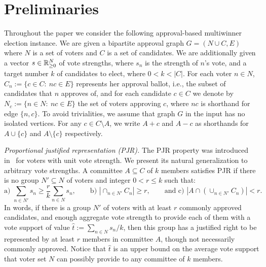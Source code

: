 \section{Preliminaries}\label{s:prel}

Throughout the paper we consider the following approval-based multiwinner election instance. 
We are given a bipartite approval graph $G=(N\cup C, E)$ where $N$ is a set of voters and $C$ is a set of candidates. 
We are additionally given a vector $s\in\mathbb{R}_{\geq 0}^N$ of vote strengths, where $s_n$ is the strength of $n$'s vote, and a target number $k$ of candidates to elect, where $0< k<|C|$.
For each voter $n\in N$, $C_n:=\{c\in C: \ nc\in E\}$ represents her approval ballot, i.e., the subset of candidates that $n$ approves of, and for each candidate $c\in C$ we denote by $N_c:=\{n\in N: \ nc\in E\}$ the set of voters approving $c$, where $nc$ is shorthand for edge $\{n,c\}$. 
To avoid trivialities, we assume that graph $G$ in the input has no isolated vertices. 
For any $c\in C\setminus A$, we write $A+c$ and $A-c$ as shorthands for $A\cup\{c\}$ and $A\setminus \{c\}$ respectively. 

\emph{Proportional justified representation (PJR).} 
The PJR property was introduced in~\cite{sanchez2017proportional} for voters with unit vote strength. We present its natural generalization to arbitrary vote strengths. A committee $A\subseteq C$ of $k$ members satisfies PJR if there is no group $N'\subseteq N$ of voters and integer $0<r\leq k$ such that:
%
$$\text{a) } \sum_{n\in N'} s_n \geq \frac{r}{k} \sum_{n\in N}s_n, \quad \quad \text{b) } |\cap_{n\in N'} C_n|\geq r, 
\quad \quad \text{and c) } |A\cap (\cup_{n\in N'} C_n)|<r.$$
%
In words, if there is a group $N'$ of voters with at least $r$ commonly approved candidates, and enough aggregate vote strength to provide each of them with a vote support of value $\hat{t}:=\sum_{n\in N} s_n / k$, then this group has a justified right to be represented by at least $r$ members in committee $A$, though not necessarily commonly approved. 
Notice that $\hat{t}$ is an upper bound on the average vote support that voter set $N$ can possibly provide to any committee of $k$ members. 

